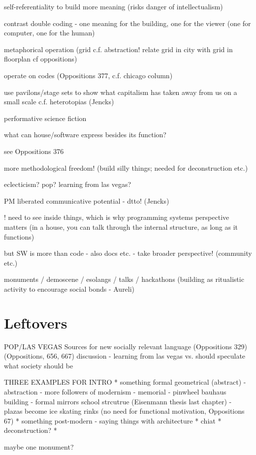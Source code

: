 self-referentiality to build more meaning
  (risks danger of intellectualism)

contrast double coding - one meaning for the building, one for the viewer
(one for computer, one for the human)

metaphorical operation (grid c.f. abstraction!
  relate grid in city with grid in floorplan cf oppositions)

operate on codes (Oppositions 377, c.f. chicago column)

use pavilons/stage sets to show what capitalism has
taken away from us on a small scale
c.f. heterotopias (Jencks)

performative science fiction

what can house/software express besides its function?

see Oppositions 376

more methodological freedom!
(build silly things; needed for deconstruction etc.)

eclecticism? pop? learning from las vegas?

PM liberated communicative potential - dtto! (Jencks)

! need to see inside things, which is why programming systems perspective matters
(in a house, you can talk through the internal structure, as long as it functions)

but SW is more than code - also docs etc. - take broader perspective!
(community etc.)

monuments / demoscene / esolangs / talks / hackathons
(building as ritualistic activity to encourage social bonds - Aureli)

\section{Leftovers}

POP/LAS VEGAS
Sources for new socially relevant language (Oppositions 329)
(Oppositions, 656,  667)
discussion - learning from las vegas
vs. should speculate what society should be


THREE EXAMPLES FOR INTRO
* something formal geometrical (abstract)
  - abstraction
  - more followers of modernism
  - memorial
  - pinwheel bauhaus building - formal mirrors school strcutrue (Eisenmann thesis last chapter)
  - plazas become ice skating rinks (no need for functional motivation, Oppositions 67)
* something post-modern - saying things with architecture
* chiat
* deconstruction?
*


maybe one monument?

